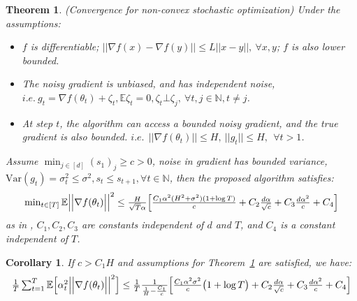 \documentclass{article}
\newtheorem{theorem}{Theorem}[section]
\newtheorem{corollary}{Corollary}[theorem]
\begin{document}
\begin{theorem}{(Convergence for non-convex stochastic optimization)}
\label{theorem:adabelief_stochastic}
Under the assumptions:
\begin{itemize}[leftmargin=*]
    \item $f$ is differentiable;  $ \vert  \vert \nabla f(x) - \nabla f(y)  \vert  \vert \leq L  \vert  \vert x-y  \vert  \vert,\ \forall x,y$; $f$ is also lower bounded.
    
    \item The noisy gradient is unbiased, and has independent noise, $i.e.\ g_t = \nabla f(\theta_t ) + \zeta_t, \mathbb{E} \zeta_t = 0, \zeta_t \bot \zeta_j, \ \forall t,j \in \mathbb{N}, t \neq j$.
    
    \item At step $t$, the algorithm can access a bounded noisy gradient, and the true gradient is also bounded. $i.e.\ \  \vert  \vert \nabla f(\theta_t ) \vert  \vert \leq H,\  \vert  \vert g_t \vert  \vert \leq H,\ \ \forall t > 1$.
\end{itemize}
Assume $\operatorname*{min}_{j \in [d]} (s_1)_j \geq c > 0$, noise in gradient has bounded variance, $\mathrm{Var} (g_t) = \sigma_t^2 \leq \sigma^2, s_t \leq s_{t+1}, \forall t \in \mathbb{N}$, then the proposed algorithm satisfies: %
\begin{align*}
\scalebox{1.0}{
$
\operatorname*{min}_{t \in [T]} \mathbb{E} \Big \vert \Big \vert \nabla f(\theta_t ) \Big \vert \Big \vert^2 \leq \frac{H}{\sqrt{T} \alpha} \Big[ \frac{C_1 \alpha^2 (H^2 + \sigma^2)(1+\log T)}{c} + C_2 \frac{d \alpha}{\sqrt{c}} + C_3 \frac{d \alpha^2}{c} + C_4 \Big] \nonumber
 $
 }
\end{align*}
as in \cite{chen2018convergence}, $C_1,C_2,C_3$ are constants independent of $d$ and $T$, and $C_4$ is a constant independent of $T$.
\end{theorem}
\begin{corollary}
If $c > C_1 H$ and assumptions for Theorem~\ref{theorem:adabelief_stochastic} are satisfied, we have:
\begin{equation*}
\scalebox{1.0}{
$
\frac{1}{T}\sum_{t=1}^T \mathbb{E} \Big[ \alpha_t^2 \Big \vert \Big \vert \nabla f(\theta_t ) \Big \vert \Big \vert^2 \Big] \leq \frac{1}{T} \frac{1}{\frac{1}{H} - \frac{C_1}{c}} \Big[ \frac{C_1 \alpha^2 \sigma^2}{c} \big(1+\log T \big) + C_2 \frac{d \alpha}{\sqrt{c}} + C_3 \frac{d \alpha^2}{c} + C_4 \Big]%
$
}
\end{equation*}
\end{corollary}
\end{document}
